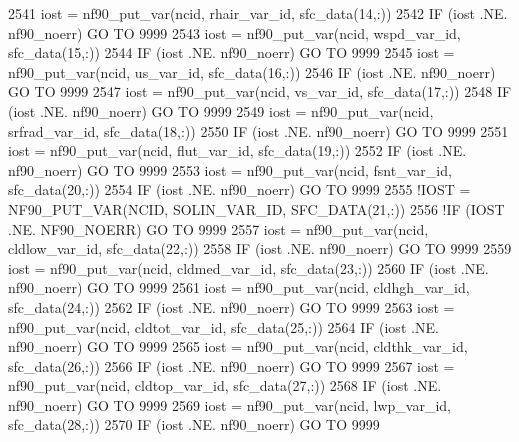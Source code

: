 \begin{DoxyCode}
{{{{{{2541     iost    = nf90\_put\_var(ncid,    rhair\_var\_id,       sfc\_data(14,:))
2542     \textcolor{keywordflow}{IF} (iost .NE. nf90\_noerr) \textcolor{keywordflow}{GO TO} 9999
2543     iost    = nf90\_put\_var(ncid,    wspd\_var\_id,        sfc\_data(15,:))
2544     \textcolor{keywordflow}{IF} (iost .NE. nf90\_noerr) \textcolor{keywordflow}{GO TO} 9999
2545     iost    = nf90\_put\_var(ncid,    us\_var\_id,          sfc\_data(16,:))
2546     \textcolor{keywordflow}{IF} (iost .NE. nf90\_noerr) \textcolor{keywordflow}{GO TO} 9999
2547     iost    = nf90\_put\_var(ncid,    vs\_var\_id,          sfc\_data(17,:))
2548     \textcolor{keywordflow}{IF} (iost .NE. nf90\_noerr) \textcolor{keywordflow}{GO TO} 9999
2549     iost    = nf90\_put\_var(ncid,    srfrad\_var\_id,      sfc\_data(18,:))
2550     \textcolor{keywordflow}{IF} (iost .NE. nf90\_noerr) \textcolor{keywordflow}{GO TO} 9999
2551     iost    = nf90\_put\_var(ncid,    flut\_var\_id,        sfc\_data(19,:))
2552     \textcolor{keywordflow}{IF} (iost .NE. nf90\_noerr) \textcolor{keywordflow}{GO TO} 9999
2553     iost    = nf90\_put\_var(ncid,    fsnt\_var\_id,        sfc\_data(20,:))
2554     \textcolor{keywordflow}{IF} (iost .NE. nf90\_noerr) \textcolor{keywordflow}{GO TO} 9999
2555     \textcolor{comment}{!IOST    = NF90\_PUT\_VAR(NCID,    SOLIN\_VAR\_ID,       SFC\_DATA(21,:))}
2556     \textcolor{comment}{!IF (IOST .NE. NF90\_NOERR) GO TO 9999}
2557     iost    = nf90\_put\_var(ncid,    cldlow\_var\_id,      sfc\_data(22,:))
2558     \textcolor{keywordflow}{IF} (iost .NE. nf90\_noerr) \textcolor{keywordflow}{GO TO} 9999
2559     iost    = nf90\_put\_var(ncid,    cldmed\_var\_id,      sfc\_data(23,:))
2560     \textcolor{keywordflow}{IF} (iost .NE. nf90\_noerr) \textcolor{keywordflow}{GO TO} 9999
2561     iost    = nf90\_put\_var(ncid,    cldhgh\_var\_id,      sfc\_data(24,:))
2562     \textcolor{keywordflow}{IF} (iost .NE. nf90\_noerr) \textcolor{keywordflow}{GO TO} 9999
2563     iost    = nf90\_put\_var(ncid,    cldtot\_var\_id,      sfc\_data(25,:))
2564     \textcolor{keywordflow}{IF} (iost .NE. nf90\_noerr) \textcolor{keywordflow}{GO TO} 9999
2565     iost    = nf90\_put\_var(ncid,    cldthk\_var\_id,      sfc\_data(26,:))
2566     \textcolor{keywordflow}{IF} (iost .NE. nf90\_noerr) \textcolor{keywordflow}{GO TO} 9999
2567     iost    = nf90\_put\_var(ncid,    cldtop\_var\_id,      sfc\_data(27,:))
2568     \textcolor{keywordflow}{IF} (iost .NE. nf90\_noerr) \textcolor{keywordflow}{GO TO} 9999
2569     iost    = nf90\_put\_var(ncid,    lwp\_var\_id,         sfc\_data(28,:))
2570     \textcolor{keywordflow}{IF} (iost .NE. nf90\_noerr) \textcolor{keywordflow}{GO TO} 9999
}}}}}}
\end{DoxyCode}
